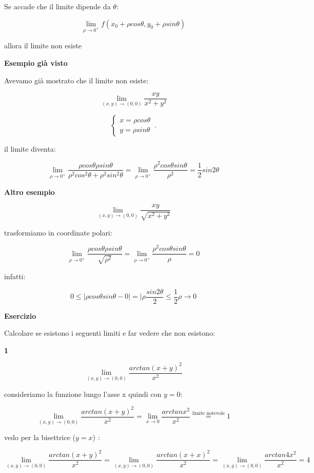 \documentclass[11pt]{article}
\begin{document}
Se accade che il limite dipende da $\theta$:

\[
       \lim_{ \rho \to 0^{+} }  f(x_0+\rho cos\theta, y_0+\rho sin \theta )
\]

allora il limite non esiste


\textbf{Esempio già visto} 

Avevamo già mostrato che il limite non esiste:

\[
\lim_{ (x,y) \to (0,0) } \frac{xy}{x^{2}+y^{2}}
\]

\begin{equation}
    \begin{cases}
           x=\rho cos \theta\\
           y = \rho sin \theta
    \end{cases}\,.
\end{equation}

il limite diventa:

\[
    \lim_{ \rho \to 0^{+} } \frac{\rho cos\theta \rho sin \theta}{\rho ^{2} cos^{2}\theta + \rho ^{2}sin ^{2}\theta}  = \lim_{ \rho \to 0^{+} } \frac{\rho^{2} cos\theta sin \theta}{\rho^{2}}  = \frac{1}{2} sin 2\theta
\]


\textbf{Altro esempio} 

\[
    \lim_{ (x,y) \to (0,0) } \frac{xy}{\sqrt{x^{2}+y^{2}}}
\]

trasformiamo in coordinate polari:

\[
    \lim_{ \rho \to 0^{+} } \frac{\rho cos\theta \rho sin \theta}{\sqrt{\rho^{2}}} = \lim_{ \rho \to 0^{+} } \frac{\rho ^{2} cos\theta sin \theta}{\rho}=0
\]

infatti:

\[
    0 \le |\rho cos\theta sin \theta -0| = |\rho \frac{sin2\theta}{2} \le \frac{1}{2}\rho \rightarrow 0
\]

\textbf{Esercizio} 

Calcolare se esistono i seguenti limiti e far vedere che non esistono:

\textbf{1} 

\[
    \lim_{ (x,y) \to (0,0) } \frac{arctan(x+y)^{2}}{x^{2}}  
\]

consideriamo la funzione lungo l'asse x quindi con $y=0$:

\[
    \lim_{ (x,y) \to (0,0) } \frac{arctan(x+y)^{2}}{x^{2}}= \lim_{ x \to 0 }  \frac{arctan x^{2} }{x^{2}} \overset{\text{limite notevole}}{=} 1
\]

vedo per la bisettrice ($y=x$) :

\[
     \lim_{ (x,y) \to (0,0) } \frac{arctan(x+y)^{2}}{x^{2}} =  \lim_{ (x,y) \to (0,0) } \frac{arctan(x+x)^{2}}{x^{2}} =  \lim_{ (x,y) \to (0,0) } \frac{arctan 4x^{2}}{x^{2}} = 4
\]
\end{document}
